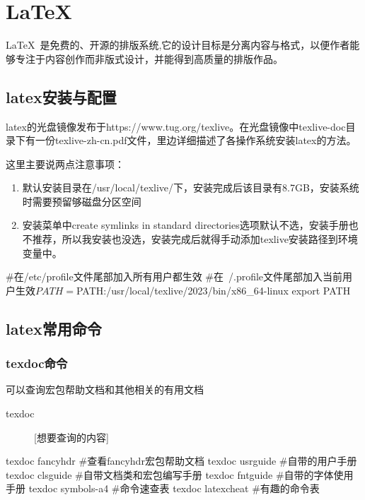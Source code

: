 \section{\LaTeX}
\LaTeX\ 是免费的、开源的排版系统,它的设计目标是分离内容与格式，以便作者能够专注于内容创作而非版式设计，并能得到高质量的排版作品。
	\subsection{latex安装与配置}
	latex的光盘镜像发布于https://www.tug.org/texlive。在光盘镜像中texlive-doc目录下有一份texlive-zh-cn.pdf文件，里边详细描述了各操作系统安装latex的方法。

	这里主要说两点注意事项：
	\begin{enumerate}
		\item 默认安装目录在/usr/local/texlive/下，安装完成后该目录有8.7GB，安装系统时需要预留够磁盘分区空间
		\item 安装菜单中create symlinks in standard directories选项默认不选，安装手册也不推荐，所以我安装也没选，安装完成后就得手动添加texlive安装路径到环境变量中。
	\end{enumerate}
\begin{shell}
#在/etc/profile文件尾部加入所有用户都生效
#在~/.profile文件尾部加入当前用户生效$
PATH=$PATH:/usr/local/texlive/2023/bin/x86_64-linux
export PATH
\end{shell}
\subsection{latex常用命令}
\subsubsection{texdoc命令}
	可以查询宏包帮助文档和其他相关的有用文档
	\begin{description}
		\item[texdoc] [想要查询的内容]
	\end{description}
\begin{shell}
texdoc fancyhdr #查看fancyhdr宏包帮助文档
texdoc usrguide #自带的用户手册
texdoc clsguide #自带文档类和宏包编写手册
texdoc fntguide #自带的字体使用手册
texdoc symbols-a4 #命令速查表
texdoc latexcheat #有趣的命令表
\end{shell}
